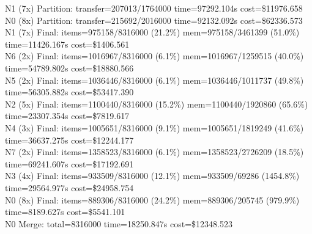 \documentclass[]{interact}
\theoremstyle{plain}
\theoremstyle{definition}
\theoremstyle{remark}
\begin{document}
N1 (7x) Partition: transfer=207013/1764000 time=97292.104\textmu s cost=\$11976.658\\
N0 (8x) Partition: transfer=215692/2016000 time=92132.092\textmu s cost=\$62336.573\\
N1 (7x) Final: items=975158/8316000 (21.2\%) mem=975158/3461399 (51.0\%) time=11426.167\textmu s cost=\$1406.561\\
N6 (2x) Final: items=1016967/8316000 (6.1\%) mem=1016967/1259515 (40.0\%) time=54789.802\textmu s cost=\$18880.566\\
N5 (2x) Final: items=1036446/8316000 (6.1\%) mem=1036446/1011737 (49.8\%) time=56305.882\textmu s cost=\$53417.390\\
N2 (5x) Final: items=1100440/8316000 (15.2\%) mem=1100440/1920860 (65.6\%) time=23307.354\textmu s cost=\$7819.617\\
N4 (3x) Final: items=1005651/8316000 (9.1\%) mem=1005651/1819249 (41.6\%) time=36637.275\textmu s cost=\$12244.177\\
N7 (2x) Final: items=1358523/8316000 (6.1\%) mem=1358523/2726209 (18.5\%) time=69241.607\textmu s cost=\$17192.691\\
N3 (4x) Final: items=933509/8316000 (12.1\%) mem=933509/69286 (1454.8\%) time=29564.977\textmu s cost=\$24958.754\\
N0 (8x) Final: items=889306/8316000 (24.2\%) mem=889306/205745 (979.9\%) time=8189.627\textmu s cost=\$5541.101\\
N0 Merge: total=8316000 time=18250.847\textmu s cost=\$12348.523
\end{document}
